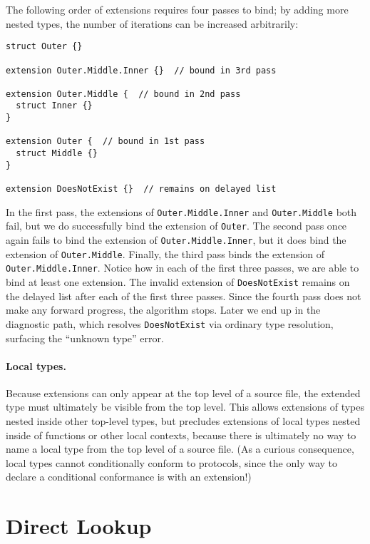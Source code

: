 \documentclass[../generics]{subfiles}
\begin{document}
\begin{example}
The following order of extensions requires four passes to bind; by adding more nested types, the number of iterations can be increased arbitrarily:
\begin{Verbatim}
struct Outer {}

extension Outer.Middle.Inner {}  // bound in 3rd pass

extension Outer.Middle {  // bound in 2nd pass
  struct Inner {}
}

extension Outer {  // bound in 1st pass
  struct Middle {}
}

extension DoesNotExist {}  // remains on delayed list
\end{Verbatim}

In the first pass, the extensions of \texttt{Outer.Middle.Inner} and \texttt{Outer.Middle} both fail, but we do successfully bind the extension of \texttt{Outer}. The second pass once again fails to bind the extension of \texttt{Outer.Middle.Inner}, but it does bind the extension of \texttt{Outer.Middle}. Finally, the third pass binds the extension of \texttt{Outer.Middle.Inner}. Notice how in each of the first three passes, we are able to bind at least one extension. The invalid extension of \texttt{DoesNotExist} remains on the delayed list after each of the first three passes. Since the fourth pass does not make any forward progress, the algorithm stops. Later we end up in the diagnostic path, which resolves \texttt{DoesNotExist} via ordinary type resolution, surfacing the ``unknown type'' error.
\end{example}

\paragraph{Local types.}
Because extensions can only appear at the top level of a source file, the extended type must ultimately be visible from the top level. This allows extensions of types nested inside other top-level types, but precludes extensions of local types nested inside of functions or other local contexts, because there is ultimately no way to name a local type from the top level of a source file. (As a curious consequence, local types cannot conditionally conform to protocols, since the only way to declare a conditional conformance is with an extension!)

\section{Direct Lookup}\label{direct lookup}
\end{document}
